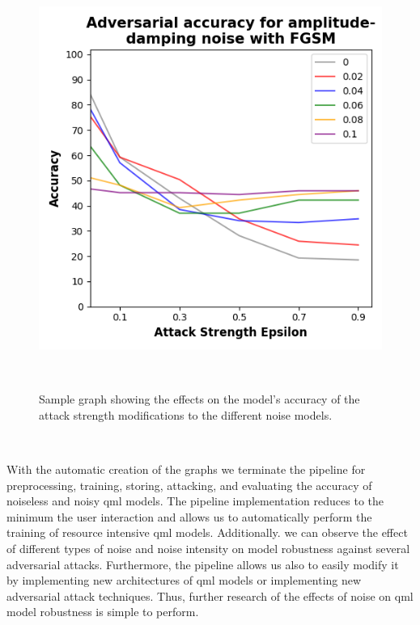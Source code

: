 \begin{figure}[h!]
  \includegraphics[scale=0.70]{figures/adversarial-graph.png}
  \centering
  \caption{Sample graph showing the effects on the model's accuracy of the attack strength modifications to the different noise models.}
~\label{fig:sample-adversarial}
\end{figure} \

With the automatic creation of the graphs we terminate the pipeline
for preprocessing, training, storing, attacking, and evaluating the
accuracy of noiseless and noisy \ac{qml} models. The pipeline implementation
reduces to the minimum the user interaction and allows us to automatically
perform the training of resource intensive \ac{qml} models. Additionally.
we can observe the effect of different types of noise and noise intensity
on model robustness against several adversarial attacks. Furthermore,
the pipeline allows us also to easily modify it by implementing new
architectures of \ac{qml} models or implementing new adversarial attack
techniques. Thus, further research of the effects of noise on \ac{qml}
model robustness is simple to perform. \

